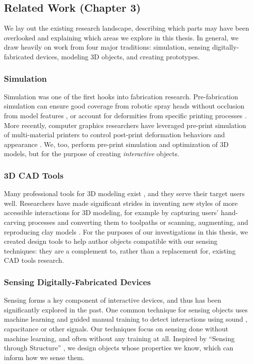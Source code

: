 \subsection{Related Work (Chapter 3)}

We lay out the existing research landscape, describing which parts may have been overlooked and explaining which areas we explore in this thesis. In general, we draw heavily on work from four major traditions: simulation, sensing digitally-fabricated devices, modeling 3D objects, and creating prototypes.

\subsubsection{Simulation}
Simulation was one of the first hooks into fabrication research. Pre-fabrication simulation can ensure good coverage from robotic spray heads without occlusion from model features \cite{gursoz-noodles}, or account for deformities from specific printing processes \cite{hsu-numerical}. More recently, computer graphics researchers have leveraged pre-print simulation of multi-material printers to control post-print deformation behaviors \cite{bickel-deformation} and appearance \cite{lan-appearance}. We, too, perform pre-print simulation and optimization of 3D models, but for the purpose of creating \emph{interactive} objects.

\subsubsection{3D CAD Tools}
Many professional tools for 3D modeling exist \cite{solidworks, rhino}, and they serve their target users well. Researchers have made significant strides in inventing new styles of more accessible interactions for 3D modeling, for example by capturing users' hand-carving processes and converting them to toolpaths \cite{willis-interactive} or scanning, augmenting, and reproducing clay models \cite{savage-mmarks}. For the purposes of our investigations in this thesis, we created design tools to help author objects compatible with our sensing techniques: they are a complement to, rather than a replacement for, existing CAD tools research.

\subsubsection{Sensing Digitally-Fabricated Devices}
Sensing forms a key component of interactive devices, and thus has been significantly explored in the past. One common technique for sensing objects uses machine learning and guided manual training to detect interactions using sound \cite{ono-touchandactivate,laput-acoustruments}, capacitance \cite{sato-touche} or other signals. Our techniques focus on sensing done without machine learning, and often without any training at all. Inspired by ``Sensing through Structure'' \cite{slyper-structure}, we design objects whose properties we know, which can inform how we sense them.

